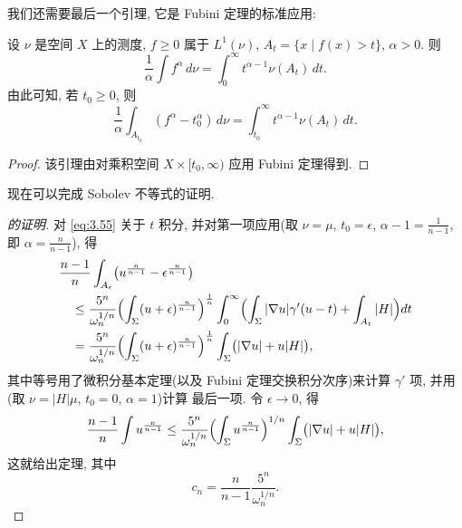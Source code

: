 我们还需要最后一个引理, 它是 Fubini 定理的标准应用:

\begin{lemma}
\label{lem:3.15}
设 $\nu$ 是空间 $X$ 上的测度, $f\geq0$ 属于 $L^1(\nu)$,
$A_t=\{x\mid f(x)>t\}$, $\alpha>0$. 则
\begin{equation}
\frac1\alpha\int f^\alpha\,d\nu
 =\int_0^\infty t^{\alpha-1}\nu(A_t)\,dt.
\label{eq:3.56}
\end{equation}
由此可知, 若 $t_0\geq0$, 则
\begin{equation}
\frac1\alpha\int_{A_{t_0}}(f^\alpha-t_0^\alpha)\,d\nu
 =\int_{t_0}^\infty t^{\alpha-1}\nu(A_t)\,dt.
\label{eq:3.57}
\end{equation}
\end{lemma}

\begin{proof}
该引理由对乘积空间 $X\times[t_0,\infty)$ 应用 Fubini 定理得到.
\end{proof}

现在可以完成 Sobolev 不等式的证明.

\begin{proof}[ 的证明]
对 \eqref{eq:3.55} 关于 $t$ 积分, 并对第一项应用(取 $\nu=\mu$,
$t_0=\epsilon$, $\alpha-1=\frac{1}{n-1}$, 即 $\alpha=\frac{n}{n-1}$), 得
\begin{equation}
\begin{aligned}
&\frac{n-1}{n}\int_{A_\epsilon}
 \bigl(u^{\frac{n}{n-1}}-\epsilon^{\frac{n}{n-1}}\bigr)\\
&\quad\leq\frac{5^n}{\omega_n^{1/n}}
 \Bigl(\int_\Sigma(u+\epsilon)^{\frac{n}{n-1}}\Bigr)^{\frac1n}
 \int_0^\infty\Bigl(\int_\Sigma|\nabla u|\gamma'(u-t)
 +\int_{A_t}|H|\Bigr)dt\\
&\quad=\frac{5^n}{\omega_n^{1/n}}
 \Bigl(\int_\Sigma(u+\epsilon)^{\frac{n}{n-1}}\Bigr)^{\frac1n}
 \int_\Sigma\bigl(|\nabla u|+u|H|\bigr),
\end{aligned}
\label{eq:3.58}
\end{equation}
其中等号用了微积分基本定理(以及 Fubini 定理交换积分次序)来计算
$\gamma'$ 项, 并用(取 $\nu=|H|\mu$, $t_0=0$, $\alpha=1$)计算
最后一项. 令 $\epsilon\to0$, 得
\begin{equation}
\frac{n-1}{n}\int u^{\frac{n}{n-1}}
 \leq\frac{5^n}{\omega_n^{1/n}}
 \Bigl(\int_\Sigma u^{\frac{n}{n-1}}\Bigr)^{1/n}
 \int_\Sigma\bigl(|\nabla u|+u|H|\bigr),
\label{eq:3.59}
\end{equation}
这就给出定理, 其中
\[
c_n=\frac{n}{n-1}\frac{5^n}{\omega_n^{1/n}}.
\]
\end{proof}

